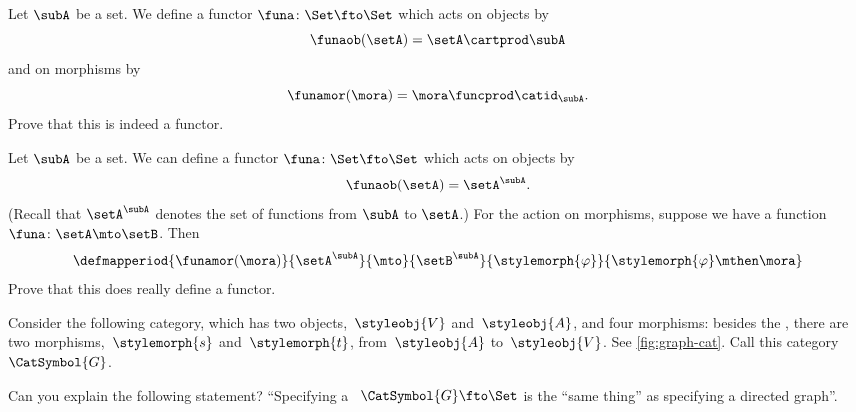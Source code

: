 \begin{gradedexercise}
    \label{ex:MultiplicationWithASet}
    Let $\subA$ be a set.
    We define a functor $\funa \colon \Set \fto \Set$ which acts on objects by
    \begin{equation}
        \funaob(\setA) = \setA \cartprod \subA
    \end{equation}
    and on morphisms by
    \begin{equation}
        \funamor(\mora) = \mora \funcprod \catid_{\subA}.
    \end{equation}
    Prove that this is indeed a functor.
\end{gradedexercise}

\begin{gradedexercise}
    \label{ex:ExponentiationWithASet}
    Let $\subA$ be a set.
    We can define a functor $\funa \colon \Set \fto \Set$ which acts on objects by
    \begin{equation}
        \funaob(\setA) = \setA^\subA.
    \end{equation}
    (Recall that $\setA^\subA$ denotes the set of functions from $\subA$ to $\setA$.)
    For the action on morphisms, suppose we have a function $\funa \colon \setA \mto \setB$.
    Then
    \begin{equation}
        \defmapperiod{\funamor(\mora)}{\setA^\subA}{\mto}{\setB^\subA}{\stylemorph{\varphi}}{\stylemorph{\varphi} \mthen \mora}
    \end{equation}
    Prove that this does really define a functor.
\end{gradedexercise}

\begin{gradedexercise}
    \label{ex:GraphsViaFunctors}
    Consider the following category, which has two objects,~$\styleobj{V}$ and~$\styleobj{A}$, and four morphisms: besides the , there are two morphisms,~$\stylemorph{s}$ and~$\stylemorph{t}$, from~$\styleobj{A}$ to~$\styleobj{V}$.
    See \cref{fig:graph-cat}.
    Call this category~$\CatSymbol{G}$.

    Can you explain the following statement?
    ``Specifying a ~$\CatSymbol{G} \fto \Set$ is the ``same thing'' as specifying a directed graph''.
\end{gradedexercise}

\begin{marginfigure}
    \centering
    \caption{}
    \label{fig:graph-cat}
\end{marginfigure}

